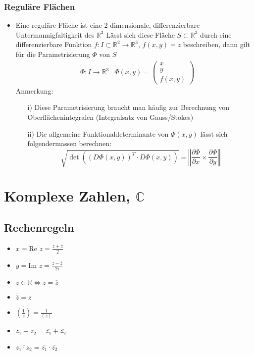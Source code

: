 \documentclass[a3paper, 11pt, landscape]{scrartcl}
\begin{document}
\begin{multicols*}{3}
	\subsubsection{Reguläre Flächen}
		\begin{itemize}
		    \item Eine reguläre Fläche ist eine 2-dimensionale, differenzierbare Untermannigfaltigkeit des $\mathbb{R}^3$ Lässt sich diese Fläche $S \subset \mathbb{R}^3$ durch eine differenzierbare Funktion $f: I \subset \mathbb{R}^2 \rightarrow \mathbb{R}^3$, \hspace{5pt} $f(x, y)=z$ beschreiben, dann gilt für die Parametrisierung $\Phi$ von $S$
		\begin{align*}
			&\Phi: I \rightarrow \mathbb{R}^3 & \Phi(x, y)=
			\begin{pmatrix}
				x\\ y\\ f(x, y)
			\end{pmatrix}
		\end{align*}
		Anmerkung:
		\begin{itemize}
			\item[i)] Diese Parametrisierung braucht man häufig zur Berechnung von Oberflächenintegralen (Integralsatz von Gauss/Stokes)
			\item[ii)] Die allgemeine Funktionaldeterminante von $\Phi(x, y)$ lässt sich folgendermassen berechnen:
			\begin{equation*}
				\sqrt{\det \left((D\Phi(x, y))^T\cdot D\Phi(x, y)\right)}=\left \Vert \frac{\partial \Phi}{\partial x} \times \frac{\partial \Phi}{\partial y} \right \Vert
			\end{equation*} 
		\end{itemize}	
		\end{itemize}
	
    \section{Komplexe Zahlen, $\mathbb{C}$}
    \subsection{Rechenregeln}
						\begin{itemize}
							\item $ x = \text{Re } z = \frac{z + \overline{z}}{2} $
							\item $ y = \text{Im } z = \frac{z - \overline{z}}{2i}$
							\item $ z \in \mathbb{R} \Longleftrightarrow z = \overline{z} $
							\item $ \overline{\overline{z}} = z $
							\item $ \overline{ \left( \frac{1}{z} \right)} = \frac{1}{(\overline{z})}$
							\item $ \overline{z_1 + z_2} = \overline{z_1} + \overline{z_2}$
							\item $ \overline{z_1 \cdot z_2} = \overline{z_1} \cdot \overline{z_2} $
						\end{itemize}

\end{multicols*}
\end{document}
